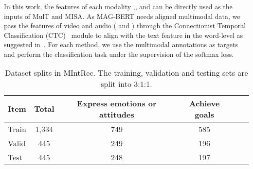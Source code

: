 \documentclass[sigconf,camera-ready]{acmart}
\begin{document}
In this work, the features of each modality ,, and  can be directly used as the inputs of MulT and MISA. As MAG-BERT needs aligned multimodal data, we pass the features of video and audio ( and  ) through the Connectionist Temporal
Classification (CTC)~\cite{graves2006connectionist} module to align with the text feature  in the word-level as suggested in~\cite{tsai2019multimodal}.  For each method, we use the multimodal annotations as targets and perform the classification task under the supervision of the softmax loss.
\begin{table}[t!]\small
	\caption{\label{datasplit} Dataset splits in MIntRec. The training, validation and testing sets are split into 3:1:1. 
	}
	\begin{tabular}{l|c|cccc} 
		\midrule
		Item  & Total  & Express emotions or attitudes   &  Achieve goals \\
		\midrule
		Train  & 1,334   & 749  & 585    \\
		Valid  & 445  & 249 & 196  \\
		Test   & 445   & 248  & 197 \\
		\midrule
	\end{tabular}
\end{table}
\end{document}
